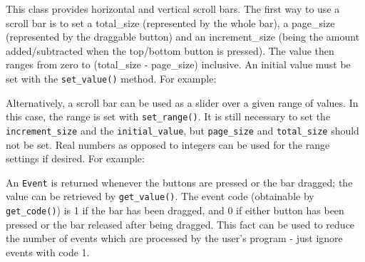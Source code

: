 \medskip{}

This class provides horizontal and vertical scroll bars.
The first way to use a scroll bar is to set a total\_size
(represented by the whole bar), a page\_size (represented by the
draggable button) and an increment\_size (being the amount
added/subtracted when the top/bottom button is pressed). The value
then ranges from zero to (total\_size - page\_size) inclusive. An
initial value must be set with the \texttt{set\_value()} method. For example:


Alternatively, a scroll bar can be used as a slider over a given range
of values. In this case, the range is set with \texttt{set\_range()}.
It is still necessary to set the \texttt{increment\_size} and the
\texttt{initial\_value}, but \texttt{page\_size} and
\texttt{total\_size} should not be set.
Real numbers as opposed to integers can be used for the range settings
if desired. For example:


An  \texttt{Event} is returned whenever the buttons are pressed or the bar
dragged; the value can be retrieved by \texttt{get\_value()}. The event code
(obtainable by \texttt{get\_code()}) is 1 if the bar has been dragged, and 0 if
either button has been pressed or the bar released after being dragged.
This fact can be used to reduce the number of events which are
processed by the user's program - just ignore events
with code 1.

